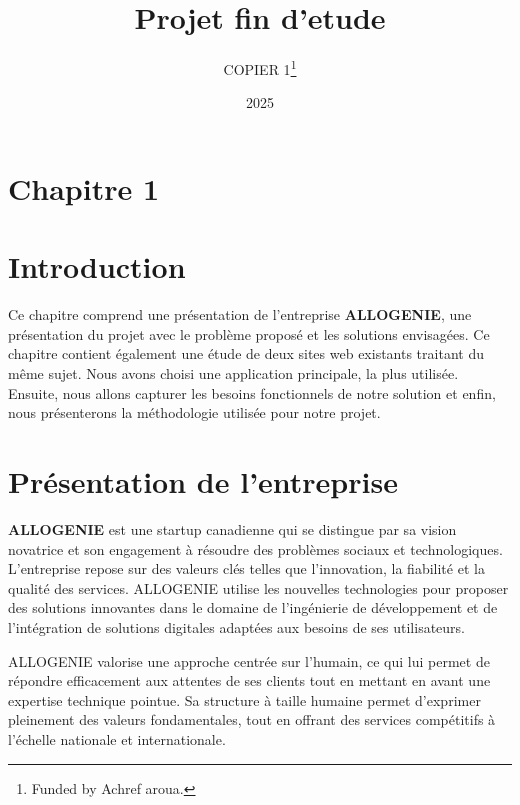\documentclass[12pt, letterpaper]{article}
\title{Projet fin d'etude}
\author{COPIER 1\thanks{Funded by Achref aroua.}}
\date{2025}
\begin{document}
\maketitle
{}  %
\setcounter{mainsection}{1}  %

\renewcommand{\thesection}{\arabic{mainsection}.\arabic{section}} %




\newpage
\tableofcontents
\newpage

\listoffigures    %
\newpage
\section*{Chapitre 1 }
\section{Introduction}
Ce chapitre comprend une présentation de l'entreprise \textbf{ALLOGENIE}, une présentation du projet avec le problème proposé et les solutions envisagées. Ce chapitre contient également une étude de deux sites web existants traitant du même sujet. Nous avons choisi une application principale, la plus utilisée. Ensuite, nous allons capturer les besoins fonctionnels de notre solution et enfin, nous présenterons la méthodologie utilisée pour notre projet.

\section{Présentation de l'entreprise}
\textbf{ALLOGENIE} est une startup canadienne qui se distingue par sa vision novatrice et son engagement à résoudre des problèmes sociaux et technologiques. L'entreprise repose sur des valeurs clés telles que l'innovation, la fiabilité et la qualité des services. ALLOGENIE utilise les nouvelles technologies pour proposer des solutions innovantes dans le domaine de l'ingénierie de développement et de l'intégration de solutions digitales adaptées aux besoins de ses utilisateurs.

ALLOGENIE valorise une approche centrée sur l'humain, ce qui lui permet de répondre efficacement aux attentes de ses clients tout en mettant en avant une expertise technique pointue. Sa structure à taille humaine permet d'exprimer pleinement des valeurs fondamentales, tout en offrant des services compétitifs à l'échelle nationale et internationale.
\end{document}
